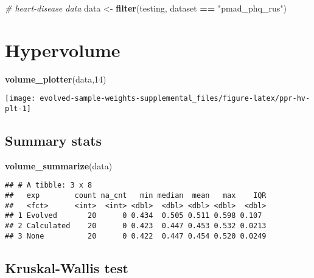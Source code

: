 \documentclass[
]{book}
\newenvironment{Shaded}{\begin{snugshade}}{\end{snugshade}}
\newcommand{\CommentTok}[1]{\textcolor[rgb]{0.56,0.35,0.01}{\textit{#1}}}
\newcommand{\DecValTok}[1]{\textcolor[rgb]{0.00,0.00,0.81}{#1}}
\newcommand{\FunctionTok}[1]{\textcolor[rgb]{0.13,0.29,0.53}{\textbf{#1}}}
\newcommand{\NormalTok}[1]{#1}
\newcommand{\OtherTok}[1]{\textcolor[rgb]{0.56,0.35,0.01}{#1}}
\newcommand{\SpecialCharTok}[1]{\textcolor[rgb]{0.81,0.36,0.00}{\textbf{#1}}}
\newcommand{\StringTok}[1]{\textcolor[rgb]{0.31,0.60,0.02}{#1}}
\begin{document}
\begin{Shaded}
\begin{Highlighting}[]
\CommentTok{\# heart{-}disease data}
\NormalTok{data }\OtherTok{\textless{}{-}} \FunctionTok{filter}\NormalTok{(testing, dataset }\SpecialCharTok{==} \StringTok{"pmad\_phq\_rus"}\NormalTok{)}
\end{Highlighting}
\end{Shaded}

\hypertarget{hypervolume-13}{%
\section{Hypervolume}\label{hypervolume-13}}

\begin{Shaded}
\begin{Highlighting}[]
\FunctionTok{volume\_plotter}\NormalTok{(data,}\DecValTok{14}\NormalTok{)}
\end{Highlighting}
\end{Shaded}

\texttt{[image: evolved-sample-weights-supplemental\_files/figure-latex/ppr-hv-plt-1]}

\hypertarget{summary-stats-13}{%
\subsection{Summary stats}\label{summary-stats-13}}

\begin{Shaded}
\begin{Highlighting}[]
\FunctionTok{volume\_summarize}\NormalTok{(data)}
\end{Highlighting}
\end{Shaded}

\begin{verbatim}
## # A tibble: 3 x 8
##   exp        count na_cnt   min median  mean   max    IQR
##   <fct>      <int>  <int> <dbl>  <dbl> <dbl> <dbl>  <dbl>
## 1 Evolved       20      0 0.434  0.505 0.511 0.598 0.107 
## 2 Calculated    20      0 0.423  0.447 0.453 0.532 0.0213
## 3 None          20      0 0.422  0.447 0.454 0.520 0.0249
\end{verbatim}

\hypertarget{kruskal-wallis-test-13}{%
\subsection{Kruskal-Wallis test}\label{kruskal-wallis-test-13}}
\end{document}
